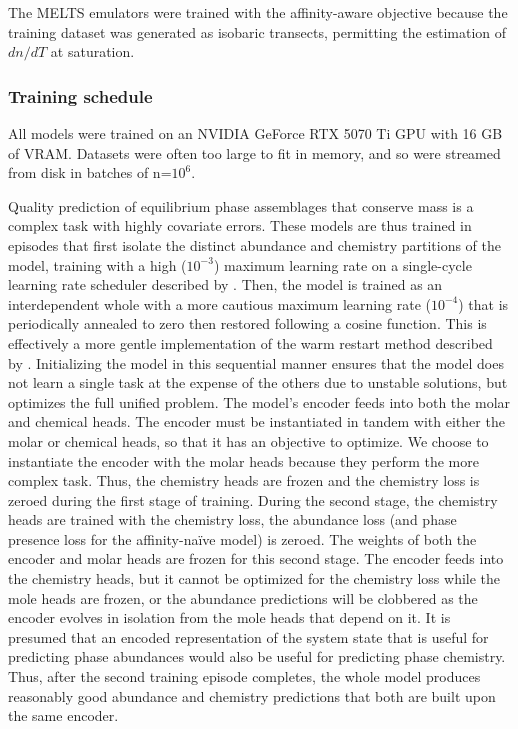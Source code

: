 The \textsc{MELTS} emulators were trained with the affinity-aware objective because the training dataset was generated as isobaric transects, 
permitting the estimation of $dn/dT$ at saturation.


\subsubsection{Training schedule}\label{ch4-training-schedule}

All models were trained on an NVIDIA GeForce RTX 5070 Ti GPU with 16 GB of VRAM. Datasets were often too large to fit in memory, and so were streamed from disk in batches of n=$10^6$.


Quality prediction of equilibrium phase assemblages that conserve mass is a complex task with highly covariate errors. These models
are thus trained in episodes that first isolate the distinct abundance and chemistry partitions of the model, training with a high ($10^{-3}$) maximum learning rate 
on a single-cycle learning rate scheduler described by \citet{smith2019}. Then, the model is trained as an interdependent whole with a more cautious maximum learning rate 
($10^{-4}$) that is periodically annealed to zero then restored following a cosine function. This is effectively a more gentle implementation of the warm restart method described by
\citet{loshchilov2017}. Initializing the model in this sequential manner ensures that the model does not learn a single task at the expense of 
the others due to unstable solutions, but optimizes the full unified problem.
The model's encoder feeds into both the molar and chemical heads. The encoder must be instantiated in tandem with either the molar or chemical heads, so that it
has an objective to optimize. We choose to instantiate the encoder with the molar heads because they perform the more complex task. Thus, the chemistry heads 
are frozen and the chemistry loss is zeroed during the first stage of training. During the second stage, the chemistry heads are trained with the chemistry loss,
the abundance loss (and phase presence loss for the affinity-na\"{i}ve model) is zeroed. The weights of both the encoder and molar heads are frozen for this second stage.
The encoder feeds into the chemistry heads, but it cannot be optimized for the chemistry loss while the mole heads are frozen, or the abundance predictions will be clobbered
as the encoder evolves in isolation from the mole heads that depend on it. It is presumed that an encoded representation of the system state that is useful for 
predicting phase abundances would also be useful for predicting phase chemistry. Thus, after the second training episode completes, the whole model produces reasonably good
abundance and chemistry predictions that both are built upon the same encoder. 

